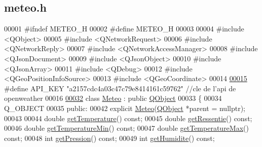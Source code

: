 \hypertarget{meteo_8h_source}{}\subsection{meteo.\+h}
\label{meteo_8h_source}

\begin{DoxyCode}
00001 \textcolor{preprocessor}{#ifndef METEO\_H}
00002 \textcolor{preprocessor}{#define METEO\_H}
00003 
00004 \textcolor{preprocessor}{#include <QObject>}
00005 \textcolor{preprocessor}{#include <QNetworkRequest>}
00006 \textcolor{preprocessor}{#include <QNetworkReply>}
00007 \textcolor{preprocessor}{#include <QNetworkAccessManager>}
00008 \textcolor{preprocessor}{#include <QJsonDocument>}
00009 \textcolor{preprocessor}{#include <QJsonObject>}
00010 \textcolor{preprocessor}{#include <QJsonArray>}
00011 \textcolor{preprocessor}{#include <QDebug>}
00012 \textcolor{preprocessor}{#include <QGeoPositionInfoSource>}
00013 \textcolor{preprocessor}{#include <QGeoCoordinate>}
00014 
\hypertarget{meteo_8h_source.tex_l00015}{}\hyperlink{meteo_8h_a187af7b881bea2905b906b75ac61c951}{00015} \textcolor{preprocessor}{#define API\_KEY "a2157cdc4a03c47c79e8414161c59762"          //cle de l'api de openweather}
00016 
\hypertarget{meteo_8h_source.tex_l00032}{}\hyperlink{class_meteo}{00032} \textcolor{keyword}{class }\hyperlink{class_meteo}{Meteo} : \textcolor{keyword}{public} \hyperlink{class_q_object}{QObject}
00033 \{
00034     Q\_OBJECT
00035 \textcolor{keyword}{public}:
00042     \textcolor{keyword}{explicit} \hyperlink{class_meteo_aa7dab03da06a05dce302c154ad9aec53}{Meteo}(\hyperlink{class_q_object}{QObject} *parent = \textcolor{keyword}{nullptr});
00043 
00044     \textcolor{keywordtype}{double} \hyperlink{class_meteo_ad0a7466f4371df14623fd03fa0bab8dd}{getTemperature}() \textcolor{keyword}{const};                          
00045     \textcolor{keywordtype}{double} \hyperlink{class_meteo_a7bcbc6280fb91ff28436e84f7d8765e7}{getRessentie}() \textcolor{keyword}{const};                            
00046     \textcolor{keywordtype}{double} \hyperlink{class_meteo_a0cef4ff7ae16cfcd820d164d1c5334c4}{getTemperatureMin}() \textcolor{keyword}{const};                       
00047     \textcolor{keywordtype}{double} \hyperlink{class_meteo_a114aadb20b0b56c1fe8a6fc2dd19c02b}{getTemperatureMax}() \textcolor{keyword}{const};                       
00048     \textcolor{keywordtype}{int} \hyperlink{class_meteo_a2a4cd85d63157f6b682d37f9c19d1683}{getPression}() \textcolor{keyword}{const};                                
00049     \textcolor{keywordtype}{int} \hyperlink{class_meteo_a336cfea55c062ebe45fbc7d1a48aaaa1}{getHumidite}() \textcolor{keyword}{const};                                

\end{DoxyCode}
